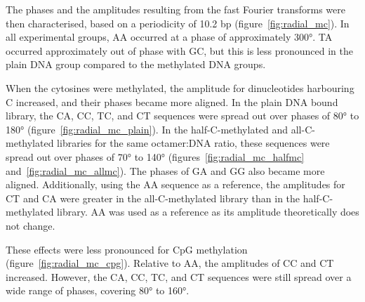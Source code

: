 \documentclass[a4paper, numbers=noenddot]{scrbook}
\begin{document}
The phases and the amplitudes resulting from the fast Fourier transforms were then characterised, based on a periodicity of 10.2 bp (figure~\ref{fig:radial_mc}).  In all experimental groups, AA occurred at a phase of approximately \ang{300}.  TA occurred approximately out of phase with GC, but this is less pronounced in the plain DNA group compared to the methylated DNA groups.

When the cytosines were methylated, the amplitude for dinucleotides harbouring C increased, and their phases became more aligned.  In the plain DNA bound library, the CA, CC, TC, and CT sequences were spread out over phases of \ang{80} to \ang{180} (figure~\ref{fig:radial_mc_plain}).  In the half-C-methylated and all-C-methylated libraries for the same octamer:DNA ratio, these sequences were spread out over phases of \ang{70} to \ang{140} (figures~\ref{fig:radial_mc_halfmc} and~\ref{fig:radial_mc_allmc}).  The phases of GA and GG also became more aligned.  Additionally, using the AA sequence as a reference, the amplitudes for CT and CA were greater in the all-C-methylated library than in the half-C-methylated library.  AA was used as a reference as its amplitude theoretically does not change. %

These effects were less pronounced for CpG methylation (figure~\ref{fig:radial_mc_cpg}).  Relative to AA, the amplitudes of CC and CT increased.  However, the CA, CC, TC, and CT sequences were still spread over a wide range of phases, covering \ang{80} to \ang{160}.
\end{document}
